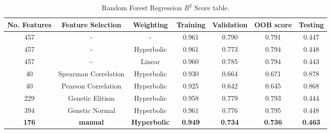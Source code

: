 \documentclass[11pt]{article}
\begin{document}
\begin{table} [h!]
\centering
\resizebox{\linewidth}{!} {
 \begin{tabular}{ | c | c |  c | c | c | c | c |}
\hline
\textbf{No.  Features} & \textbf{Feature Selection} & \textbf{Weighting} & \textbf{Training} & \textbf{Validation} & \textbf{OOB score} & \textbf{Testing} \\ [0.5 ex]
\hline \hline
457 & - & - & 0.961 & 0.790 & 0.791 & 0.447\\
457 & - & Hyperbolic &  0.961 & 0.773 & 0.794 & 0.448\\
457 & - & Linear &  0.960 & 0.785 & 0.794 & 0.443\\
40 & Spearman Correlation & Hyperbolic &  0.930 & 0.664 & 0.671 & 0.878  \\ 
40 & Pearson Correlation & Hyperbolic &  0.925 & 0.642 & 0.645 & 0.868  \\ 
229 & Genetic Elitism & Hyperbolic  & 0.958 &  0.779 & 0.793 & 0.444 \\
394 & Genetic Normal& Hyperbolic & 0.961 & 0.776 & 0.795 & 0.448 \\
\textbf{176} & \textbf{manual}  & \textbf{Hyperbolic} &  \textbf{0.949} & \textbf{0.734} & \textbf{0.736} & \textbf{0.463}  \\ [1ex]
\hline
\end{tabular}
}
\caption{Random Forest Regression $R^2$ Score table.}
\label {table:3}
\end{table}
\end{document}
